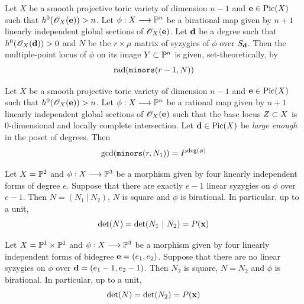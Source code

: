 \documentclass[]{beamer}
\begin{document}
\begin{frame}
\begin{conjecture}
	Let $X$ be a smooth projective toric variety of dimension $n-1$
	and $\mathbf e\in\operatorname{Pic}(X)$ such that $h^0(\mathscr{O}_X(\mathbf e))>n$.
	Let $\phi:X\longrightarrow\mathbb{P}^n$ be a birational map given by $n+1$ linearly independent
	global sections of $\mathscr{O}_X(\mathbf e)$.
	Let $\mathbf d$ be a degree such that $h^0(\mathscr{O}_X(\mathbf d))>0$
	and $N$ be the $r\times\mu$ matrix of syzygies of $\phi$ over $S_\mathbf d$. Then
	the multiple-point locus of $\phi$ on its image $Y\subset\mathbb{P}^n$ is given,
	set-theoretically, by
	\[
		\operatorname{rad}(\mathop{\tt minors}(r-1,N))
	\]
\end{conjecture}
\end{frame}

\begin{frame}
\begin{corollary}
	Let $X$ be a smooth projective toric variety of dimension $n-1$
	and $\mathbf e\in\operatorname{Pic}(X)$ such that $h^0(\mathscr{O}_X(\mathbf e))>n$.
	Let $\phi:X\longrightarrow\mathbb{P}^n$ be a rational map given by $n+1$ linearly independent
	global sections of $\mathscr{O}_X(\mathbf e)$ such that the base locus $Z\subset X$ is 0-dimensional
	and locally complete intersection.
	Let $\mathbf d\in\operatorname{Pic}(X)$ be {\em large enough} in the poset of degrees. Then
	\[
		\gcd(\mathop{\tt minors}(r,N_1))=P^{\deg(\phi)}
	\]
\end{corollary}
\end{frame}

\begin{frame}
\begin{corollary}
	Let $X=\mathbb{P}^2$ and $\phi:X\longrightarrow\mathbb{P}^3$ be a morphism given by four linearly independent forms of degree $e$.
	Suppose that there are exactly $e-1$ linear syzygies on $\phi$ over $e-1$.
	Then $N=(N_1~|~N_2)$, $N$ is square and $\phi$ is birational. In particular, up to a unit,
	\[
		\det(N)=\det(N_1~|~N_2)=P(\mathbf x)
	\]
\end{corollary}
\end{frame}

\begin{frame}
\begin{corollary}
	Let $X=\mathbb{P}^1\times\mathbb{P}^1$ and $\phi:X\longrightarrow\mathbb{P}^3$ be a morphism given by four linearly independent forms of bidegree $\mathbf e=(e_1,e_2)$.
	Suppose that there are no linear syzygies on $\phi$ over $\mathbf d=(e_1-1,e_2-1)$.
	Then $N_2$ is square, $N=N_2$ and $\phi$ is birational. In particular, up to a unit,
	\[
		\det(N)=\det(N_2)=P(\mathbf x)
	\]
\end{corollary}
\end{frame}
\end{document}
